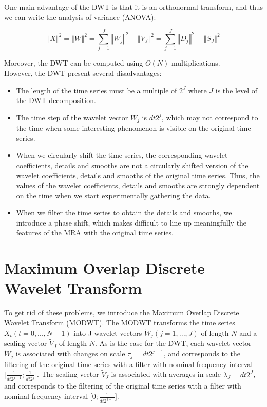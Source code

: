 \documentclass[workdone.tex]{subfiles}
\begin{document}
One main advantage of the DWT is that it is an orthonormal transform, and thus we can write the analysis of variance (ANOVA):

\begin{equation}
\left\Vert X \right\Vert ^2 = \left\Vert W \right\Vert ^2 = \sum_{j = 1}^{J} \left\Vert W_j \right\Vert ^2 + \left\Vert V_J \right\Vert ^2 = \sum_{j = 1}^{J} \left\Vert D_j \right\Vert ^2 + \left\Vert S_J \right\Vert ^2
\end{equation}

Moreover, the DWT can be computed using $O \left( N \right)$ multiplications. \\

However, the DWT present several disadvantages:

\begin{itemize}
	\item The length of the time series must be a multiple of $2^J$ where $J$ is the level of the DWT decomposition.
	\item The time step of the wavelet vector $W_j$ is $dt 2^j$, which may not correspond to the time when some interesting phenomenon is visible on the original time series.
	\item When we circularly shift the time series, the corresponding wavelet coefficients, details and smooths are not a circularly shifted version of the wavelet coefficients, details and smooths of the original time series. Thus, the values of the wavelet coefficients, details and smooths are strongly dependent on the time when we start experimentally gathering the data.
	\item When we filter the time series to obtain the details and smooths, we introduce a phase shift, which makes difficult to line up meaningfully the features of the MRA with the original time series.
\end{itemize}

\section{Maximum Overlap Discrete Wavelet Transform}

To get rid of these problems, we introduce the Maximum Overlap Discrete Wavelet Transform (MODWT). The MODWT transforms the time series $X_t \left( t = 0, ... , N - 1 \right)$ into J wavelet vectors $\widetilde{W}_j \left( j = 1 , ... , J \right)$ of length $N$ and a scaling vector $\widetilde{V}_J$ of length $N$. As is the case for the DWT, each wavelet vector $\widetilde{W}_j$ is associated with changes on scale $\tau_j = dt 2^{j - 1}$, and corresponds to the filtering of the original time series with a filter with nominal frequency interval $\lbrack \frac{1}{dt 2^{j + 1}} ; \frac{1}{dt 2^j} \rbrack$. The scaling vector $\widetilde{V}_J$ is associated with averages in scale $\lambda_J = dt 2^J$, and corresponds to the filtering of the original time series with a filter with nominal frequency interval $\lbrack 0 ; \frac{1}{dt 2^{j + 1}} \rbrack$. \\
\end{document}
